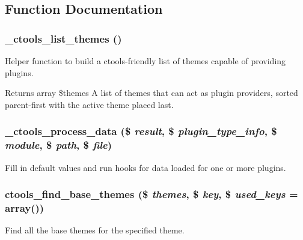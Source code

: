 \subsection{Function Documentation}
\hypertarget{ctools_2includes_2plugins_8inc_ae5c72cfffee3e4bb17c0d94ad9ba65a9}{
\subsubsection[{\_\-ctools\_\-list\_\-themes}]{\setlength{\rightskip}{0pt plus 5cm}\_\-ctools\_\-list\_\-themes ()}}
\label{ctools_2includes_2plugins_8inc_ae5c72cfffee3e4bb17c0d94ad9ba65a9}
Helper function to build a ctools-\/friendly list of themes capable of providing plugins.

\begin{DoxyReturn}{Returns}
array \$themes A list of themes that can act as plugin providers, sorted parent-\/first with the active theme placed last. 
\end{DoxyReturn}
\hypertarget{ctools_2includes_2plugins_8inc_a634693920c81e6d69da96fe997af17d1}{
\subsubsection[{\_\-ctools\_\-process\_\-data}]{\setlength{\rightskip}{0pt plus 5cm}\_\-ctools\_\-process\_\-data (\$ {\em result}, \/  \$ {\em plugin\_\-type\_\-info}, \/  \$ {\em module}, \/  \$ {\em path}, \/  \$ {\em file})}}
\label{ctools_2includes_2plugins_8inc_a634693920c81e6d69da96fe997af17d1}
Fill in default values and run hooks for data loaded for one or more plugins. \hypertarget{ctools_2includes_2plugins_8inc_a54ce9c42d2bdffee037746dfd46261a7}{
\subsubsection[{ctools\_\-find\_\-base\_\-themes}]{\setlength{\rightskip}{0pt plus 5cm}ctools\_\-find\_\-base\_\-themes (\$ {\em themes}, \/  \$ {\em key}, \/  \$ {\em used\_\-keys} = {\ttfamily array()})}}
\label{ctools_2includes_2plugins_8inc_a54ce9c42d2bdffee037746dfd46261a7}
Find all the base themes for the specified theme.

